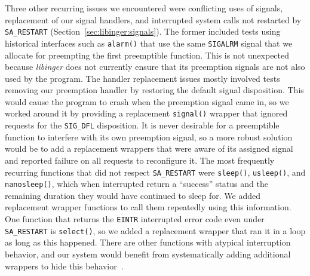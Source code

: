 Three other recurring issues we encountered were conflicting uses of signals,
replacement of our signal handlers, and interrupted system calls not restarted by
\texttt{SA\_RESTART} (Section~\ref{sec:libinger:signals}).  The former included tests
using historical interfaces such as \texttt{alarm()} that use the same
\texttt{SIGALRM} signal that we allocate for preempting the first preemptible
function.  This is not unexpected because \textit{libinger} does not currently ensure
that its preemption signals are not also used by the program.  The handler
replacement issues mostly involved tests removing our preemption handler by restoring
the default signal disposition.  This would cause the program to crash when the
preemption signal came in, so we worked around it by providing a replacement
\texttt{signal()} wrapper that ignored requests for the \texttt{SIG\_DFL}
disposition.  It is never desirable for a preemptible function to interfere with its
own preemption signal, so a more robust solution would be to add a replacement
wrappers that were aware of its assigned signal and reported failure on all requests
to reconfigure it.  The most frequently recurring functions that did not respect
\texttt{SA\_RESTART} were \texttt{sleep()}, \texttt{usleep()}, and
\texttt{nanosleep()}, which when interrupted return a ``success'' status and the
remaining duration they would have continued to sleep for.  We added replacement
wrapper functions to call them repeatedly using this information.  One function that
returns the \texttt{EINTR} interrupted error code even under \texttt{SA\_RESTART} is
\texttt{select()}, so we added a replacement wrapper that ran it in a loop as long as
this happened.  There are other functions with atypical interruption behavior, and
our system would benefit from systematically adding additional wrappers to hide this
behavior~\cite{signal-manpage}.

